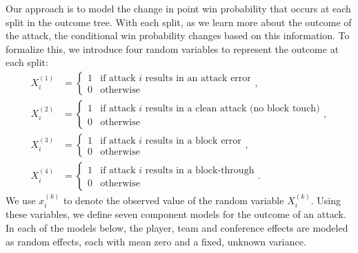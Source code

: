 \documentclass[USenglish]{article}
\theoremstyle{dgthm}
\theoremstyle{dgdef}
\begin{document}
Our approach is to model the change in point win probability that occurs at each split in the outcome tree. With each split, as we learn more about the outcome of the attack, the conditional win probability changes based on this information. To formalize this, we introduce four random variables to represent the outcome at each split:
\begin{align*}
    X_i^{(1)} &= \begin{cases}
        1   & \mbox{if attack $i$ results in an attack error}\\
        0   & \mbox{otherwise}
    \end{cases},\\
    X_i^{(2)} &= \begin{cases}
        1   & \mbox{if attack $i$ results in a clean attack (no block touch)}\\
        0   & \mbox{otherwise}
    \end{cases},\\
    X_i^{(3)} &= \begin{cases}
        1   & \mbox{if attack $i$ results in a block error}\\
        0   & \mbox{otherwise}
    \end{cases},\\
    X_i^{(4)} &= \begin{cases}
        1   & \mbox{if attack $i$ results in a block-through}\\
        0   & \mbox{otherwise}
    \end{cases}.
\end{align*}
We use $x_i^{(k)}$ to denote the observed value of the random variable $X_i^{(k)}$. Using these variables, we define seven component models for the outcome of an attack. In each of the models below, the player, team and conference effects are modeled as random effects, each with mean zero and a fixed, unknown variance.\\
\end{document}
